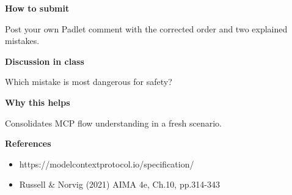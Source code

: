 \documentclass[11pt]{article}
\begin{document}
\begin{tcolorbox}[colback=white,colframe=MidnightBlue,title={Q5 MCP Workflow Check},fonttitle=\bfseries,breakable]
{\large\bfseries\color{MidnightBlue} How to submit}\par\medskip
Post your own Padlet comment with the corrected order and two explained mistakes.

{\large\bfseries\color{MidnightBlue} Discussion in class}\par\medskip
Which mistake is most dangerous for safety?

{\large\bfseries\color{MidnightBlue} Why this helps}\par\medskip
Consolidates MCP flow understanding in a fresh scenario.

{\large\bfseries\color{MidnightBlue} References}\par\medskip
\begin{itemize}\item https://modelcontextprotocol.io/specification/
\item Russell \& Norvig (2021) AIMA 4e, Ch.10, pp.314-343\end{itemize}
\end{tcolorbox}
\end{document}

